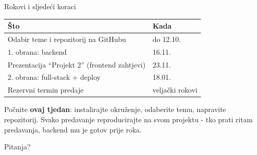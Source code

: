 \begin{frame}{Rokovi i sljedeći koraci}
\begin{tabular}{@{}ll@{}}
  \toprule
  \textbf{Što} & \textbf{Kada} \\
  \midrule
  Odabir teme i repozitorij na GitHubu & do 12.10. \\
  1. obrana: backend & 16.11. \\
  Prezentacija \enquote{Projekt 2} (frontend zahtjevi) & 23.11. \\
  2. obrana: full-stack + deploy & 18.01. \\
  Rezervni termin predaje & veljački rokovi \\
  \bottomrule
\end{tabular}

\vspace{0.6em}
Počnite \textbf{ovaj tjedan}: instalirajte okruženje, odaberite temu, napravite repozitorij. Svako predavanje reproducirajte na svom projektu - tko prati ritam predavanja, backend mu je gotov prije roka.

\vspace{0.6em}
\begin{center}
\Large Pitanja?
\end{center}
\end{frame}


